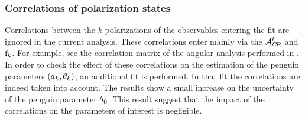 \subsubsection{Correlations of polarization states}
Correlations between the $k$ polarizations of the observables entering the \chisq fit are ignored in the
current analysis. These correlations enter mainly via the $\mathcal{A}_{C\!P}^{k}$ and $\text{f}_{k}$. For example, see the
correlation matrix  of the angular analysis performed in .
In order to check the effect of these correlations on the estimation of the penguin parameters $(a_k,\theta_k)$,
an additional \chisq fit is performed. In that fit the correlations are indeed taken into account.
The results show a small increase on the uncertainty of the penguin parameter $\theta_{0}$.
This result suggest that the impact of the correlations on the parameters of interest is negligible.
